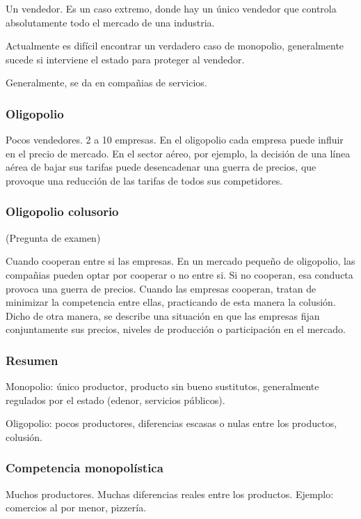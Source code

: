 Un vendedor.
Es un caso extremo,
donde hay un único vendedor que controla absolutamente 
todo el mercado de una industria.

Actualmente es difícil encontrar un verdadero caso de monopolio,
generalmente sucede si interviene el estado para proteger al vendedor.

Generalmente, se da en compañias de servicios.

\subsubsection{Oligopolio}

Pocos vendedores.
2 a 10 empresas.
En el oligopolio cada empresa puede influir en el precio de mercado.
En el sector aéreo, por ejemplo,
la decisión de una línea aérea de bajar sus tarifas puede desencadenar una guerra de precios,
que provoque una reducción de las tarifas de todos sus competidores.

\subsubsection{Oligopolio colusorio}

(Pregunta de examen)

Cuando cooperan entre si las empresas.
En un mercado pequeño de oligopolio,
las compañias pueden optar por cooperar o no entre si.
Si no cooperan, esa conducta provoca una guerra de precios.
Cuando las empresas cooperan, 
tratan de minimizar la competencia entre ellas,
practicando de esta manera la colusión.
Dicho de otra manera,
se describe una situación en que las empresas fijan conjuntamente sus precios,
niveles de producción
o participación en el mercado.

\subsubsection{Resumen}

Monopolio: único productor,
producto sin bueno sustitutos,
generalmente regulados por el estado (edenor, servicios públicos).

Oligopolio: pocos productores,
diferencias escasas o nulas entre los productos,
colusión.

\subsubsection{Competencia monopolística}

Muchos productores. Muchas diferencias reales entre los productos.
Ejemplo: comercios al por menor, pizzería.

